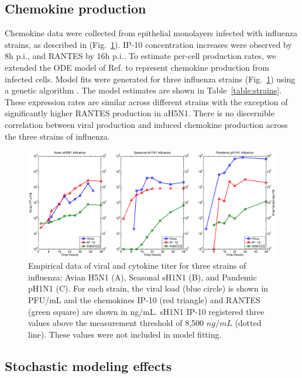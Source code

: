 \documentclass[10pt]{article}
\begin{document}
\subsection*{Chemokine production}

Chemokine data were collected from epithelial monolayers infected with influenza strains, as described in \cite{Mitchell2011} (Fig.~\ref{fig:data}).  IP-10 concentration increases were observed by 8h p.i., and RANTES by 16h p.i..  To estimate per-cell production rates, we extended the ODE model of Ref. \cite{Mitchell2011} to represent chemokine production from infected cells.  Model fits were generated for three influenza strains (Fig.~\ref{fig:data}) using a genetic algorithm \cite{Mitchell2011}.  The model estimates are shown in Table~\ref{table:strains}.  These expression rates are similar across different strains with the exception of significantly higher RANTES production in aH5N1.  There is no discernible correlation between viral production and induced chemokine production across the three strains of influenza.

\begin{figure}[ht!]
\begin{center}
 \includegraphics[width=\textwidth]{data}
 \end{center}
\caption{Empirical data of viral and cytokine titer for three strains of influenza: Avian H5N1 (A), Seasonal sH1N1 (B), and Pandemic pH1N1 (C).  For each strain, the viral load (blue circle) is shown in PFU/mL and the chemokines IP-10 (red triangle) and RANTES (green square) are shown in ng/mL.  sH1N1 IP-10 registered three values above the measurement threshold of 8,500 $ng/mL$ (dotted line).  These values were not included in model fitting.} 
 \label{fig:data}
\end{figure}

\subsection*{Stochastic modeling effects}
\end{document}

